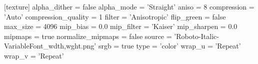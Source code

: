 [texture]
alpha_dither = false
alpha_mode = 'Straight'
aniso = 8
compression = 'Auto'
compression_quality = 1
filter = 'Anisotropic'
flip_green = false
max_size = 4096
mip_bias = 0.0
mip_filter = 'Kaiser'
mip_sharpen = 0.0
mipmaps = true
normalize_mipmaps = false
source = 'Roboto-Italic-VariableFont_wdth,wght.png'
srgb = true
type = 'color'
wrap_u = 'Repeat'
wrap_v = 'Repeat'